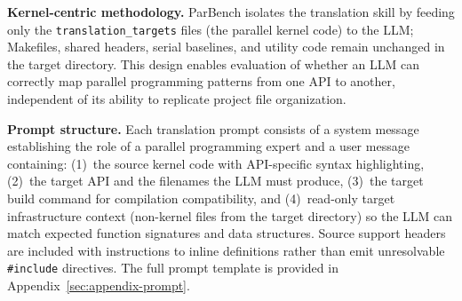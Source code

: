 \documentclass{article}
\begin{document}

\textbf{Kernel-centric methodology.} ParBench isolates the translation skill by feeding only the \texttt{translation\_targets} files (the parallel kernel code) to the LLM; Makefiles, shared headers, serial baselines, and utility code remain unchanged in the target directory. This design enables evaluation of whether an LLM can correctly map parallel programming patterns from one API to another, independent of its ability to replicate project file organization.

\textbf{Prompt structure.} Each translation prompt consists of a system message establishing the role of a parallel programming expert and a user message containing: (1)~the source kernel code with API-specific syntax highlighting, (2)~the target API and the filenames the LLM must produce, (3)~the target build command for compilation compatibility, and (4)~read-only target infrastructure context (non-kernel files from the target directory) so the LLM can match expected function signatures and data structures. Source support headers are included with instructions to inline definitions rather than emit unresolvable \texttt{\#include} directives. The full prompt template is provided in Appendix~\ref{sec:appendix-prompt}.
\end{document}

